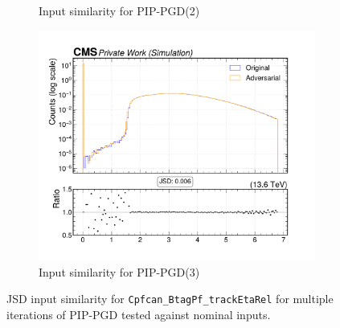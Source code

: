 \begin{figure}[htbp]
\begin{subfigure}[t]{0.32\textwidth}
    \caption*{Input similarity for PIP-PGD(2)}
  \end{subfigure}\hfill
  \begin{subfigure}[t]{0.32\textwidth}
    \includegraphics[width=\linewidth]{media/output/features/compare/combined_it_3/cmp_cpf_arr_Cpfcan_BtagPf_trackEtaRel.pdf}
    \caption*{Input similarity for PIP-PGD(3)}
  \end{subfigure}

  \caption*{JSD input similarity for \texttt{Cpfcan\_BtagPf\_trackEtaRel} for multiple iterations of PIP-PGD tested against nominal inputs.}
  \label{fig:combined_input_Cpfcan_BtagPf_trackEtaRel}
\end{figure}


